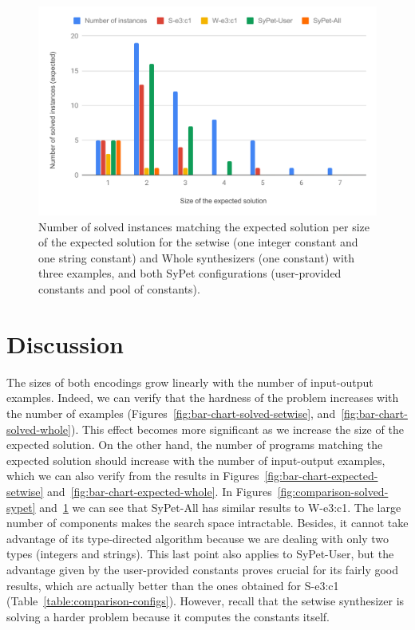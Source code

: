 \begin{figure}
  \centering
  \includegraphics[width=1.0\textwidth]{assets/comparison-expected-sypet.pdf}
  \caption{Number of solved instances matching the expected solution per size of
    the expected solution for the setwise (one integer constant and one string
    constant) and Whole synthesizers (one constant) with three examples, and
    both SyPet configurations (user-provided constants and pool of constants).}
  \label{fig:comparison-expected-sypet}
\end{figure}

\section{Discussion}
\label{sec:discussion}

The sizes of both encodings grow linearly with the number of input-output
examples. Indeed, we can verify that the hardness of the problem increases with
the number of examples (Figures~\ref{fig:bar-chart-solved-setwise},
and~\ref{fig:bar-chart-solved-whole}).
This effect becomes more significant as we increase the size of the expected
solution.
On the other hand, the number of programs matching the expected solution should
increase with the number of input-output examples, which we can also verify from
the results in
Figures~\ref{fig:bar-chart-expected-setwise}
and~\ref{fig:bar-chart-expected-whole}.
In Figures~\ref{fig:comparison-solved-sypet}
and~\ref{fig:comparison-expected-sypet} we can see that SyPet-All has similar
results to W-e3:c1.
The large number of components makes the search space intractable.
Besides, it cannot take advantage of its type-directed algorithm because we are
dealing with only two types (integers and strings).
This last point also applies to SyPet-User, but the advantage given by the
user-provided constants proves crucial for its fairly good results, which are
actually better than the ones obtained for S-e3:c1
(Table~\ref{table:comparison-configs}).
However, recall that the setwise synthesizer is solving a harder problem because
it computes the constants itself.

